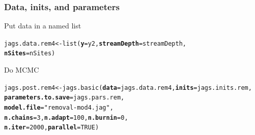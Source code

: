 \documentclass[color=usenames,dvipsnames]{beamer}\usepackage[]{graphicx}\usepackage[]{color}
\makeatletter
\newcommand{\hlnum}[1]{\textcolor[rgb]{0.69,0.494,0}{#1}}%
\newcommand{\hlstr}[1]{\textcolor[rgb]{0.749,0.012,0.012}{#1}}%
\newcommand{\hlstd}[1]{\textcolor[rgb]{0,0,0}{#1}}%
\newcommand{\hlkwb}[1]{\textcolor[rgb]{0,0.341,0.682}{#1}}%
\newcommand{\hlkwc}[1]{\textcolor[rgb]{0,0,0}{\textbf{#1}}}%
\newcommand{\hlkwd}[1]{\textcolor[rgb]{0.004,0.004,0.506}{#1}}%
\newenvironment{kframe}{%
 \def\at@end@of@kframe{}%
 \ifinner\ifhmode%
  \def\at@end@of@kframe{\end{minipage}}%
  \begin{minipage}{\columnwidth}%
 \fi\fi%
 \def\FrameCommand##1{\hskip\@totalleftmargin \hskip-\fboxsep
 \colorbox{shadecolor}{##1}\hskip-\fboxsep
     \hskip-\linewidth \hskip-\@totalleftmargin \hskip\columnwidth}%
 \MakeFramed {\advance\hsize-\width
   \@totalleftmargin\z@ \linewidth\hsize
   \@setminipage}}%
 {\par\unskip\endMakeFramed%
 \at@end@of@kframe}
\newenvironment{knitrout}{}{} %
\makeatother
\begin{document}
\begin{frame}[fragile]
  \frametitle{Data, inits, and parameters}
  Put data in a named list
  \vspace{-12pt}
\begin{knitrout}\small
{}\color{fgcolor}\begin{kframe}
\begin{alltt}
\hlstd{jags.data.rem4} \hlkwb{<-} \hlkwd{list}\hlstd{(}\hlkwc{y}\hlstd{=y2,} \hlkwc{streamDepth}\hlstd{=streamDepth,}
                       \hlkwc{nSites}\hlstd{=nSites)}
\end{alltt}
\end{kframe}
\end{knitrout}
\vfill
  Do MCMC
\begin{knitrout}\scriptsize
{}\color{fgcolor}\begin{kframe}
\begin{alltt}
\hlstd{jags.post.rem4} \hlkwb{<-} \hlkwd{jags.basic}\hlstd{(}\hlkwc{data}\hlstd{=jags.data.rem4,} \hlkwc{inits}\hlstd{=jags.inits.rem,}
                             \hlkwc{parameters.to.save}\hlstd{=jags.pars.rem,}
                             \hlkwc{model.file}\hlstd{=}\hlstr{"removal-mod4.jag"}\hlstd{,}
                             \hlkwc{n.chains}\hlstd{=}\hlnum{3}\hlstd{,} \hlkwc{n.adapt}\hlstd{=}\hlnum{100}\hlstd{,} \hlkwc{n.burnin}\hlstd{=}\hlnum{0}\hlstd{,}
                             \hlkwc{n.iter}\hlstd{=}\hlnum{2000}\hlstd{,} \hlkwc{parallel}\hlstd{=}\hlnum{TRUE}\hlstd{)}
\end{alltt}
\end{kframe}
\end{knitrout}
\end{frame}
\end{document}
